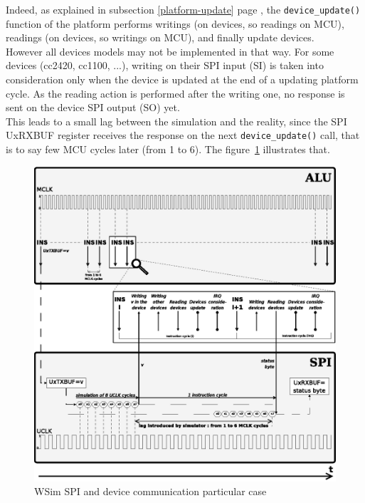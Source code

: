 \documentclass[a4paper,10pt]{report}
\begin{document}
Indeed, as explained in subsection \ref{platform-update} page \pageref{platform-update}, the \verb$device_update()$ function of the platform performs writings (on devices, so readings on MCU), readings (on devices, so writings on MCU), and finally update devices.\\

However all devices models may not be implemented in that way. For some devices (cc2420, cc1100, ...), writing on their SPI input (SI) is taken into consideration only when the device is updated at the end of a updating platform cycle. As the reading action is performed after the writing one, no response is sent on the device SPI output (SO) yet.\\

This leads to a small lag between the simulation and the reality, since the SPI UxRXBUF register receives the response on the next \verb$device_update()$ call, that is to say few MCU cycles later (from 1 to 6).
The figure~\ref{wsim-spi-communication} illustrates that.\\

\begin{figure}[!h]
\begin{center}
  \includegraphics[scale=1]{figures/wsim_spi.eps}
\end{center}
\caption{WSim SPI and device communication particular case}
\label{wsim-spi-communication}
\end{figure}
\end{document}
